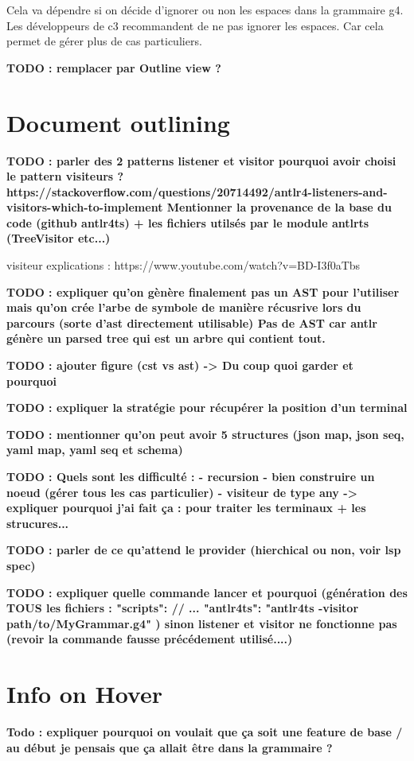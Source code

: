 \documentclass[
    iict, %
    il, %
]{heig-tb}
\begin{document}
Cela va dépendre si on décide d'ignorer ou non les espaces dans la grammaire g4.
Les développeurs de c3 recommandent de ne pas ignorer les espaces. Car cela permet de gérer plus de cas particuliers.

\textbf{TODO : remplacer par Outline view ?}
\section{Document outlining}

\textbf{TODO : parler des 2 patterns listener et visitor
    pourquoi avoir choisi le pattern visiteurs ? https://stackoverflow.com/questions/20714492/antlr4-listeners-and-visitors-which-to-implement
    Mentionner la provenance de la base du code (github antlr4ts) + les fichiers utilsés par le module antlrts (TreeVisitor etc...)
}

visiteur explications : https://www.youtube.com/watch?v=BD-I3f0aTbs

\textbf{TODO : expliquer qu'on gènère finalement pas un AST pour l'utiliser mais qu'on crée l'arbe de symbole de manière récusrive lors du parcours (sorte d'ast directement utilisable)
    Pas de AST car antlr génère un parsed tree qui est un arbre qui contient tout.}


\textbf{TODO : ajouter figure (cst vs ast) -> Du coup quoi garder et pourquoi }

\textbf{TODO : expliquer la stratégie pour récupérer la position d'un terminal}

\textbf{TODO : mentionner qu'on peut avoir 5 structures (json map, json seq, yaml map, yaml seq et schema) }

\textbf{
    TODO :
    Quels sont les difficulté :
    - recursion
    - bien construire un noeud (gérer tous les cas particulier)
    - visiteur de type any -> expliquer pourquoi j'ai fait ça : pour traiter les terminaux + les strucures...
}

\textbf{TODO : parler de ce qu'attend le provider (hierchical ou non, voir lsp spec)}

\textbf{TODO : expliquer quelle commande lancer et pourquoi (génération des TOUS les fichiers :
"scripts": {
// ...
"antlr4ts": "antlr4ts -visitor path/to/MyGrammar.g4"
}) sinon listener et visitor ne fonctionne pas (revoir la commande fausse précédement utilisé....)}


\section{Info on Hover}
\textbf{Todo : expliquer pourquoi on voulait que ça soit une feature de base / au début je pensais que ça allait être dans la grammaire ?}
\end{document}
